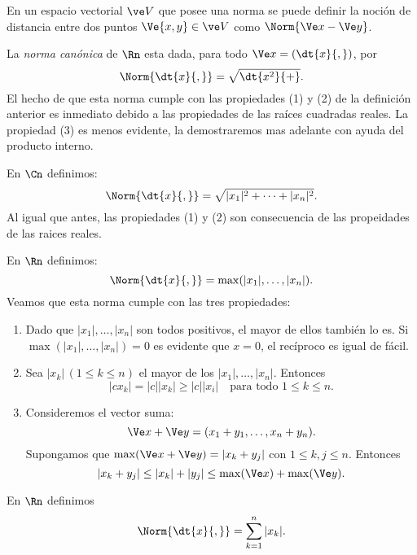 \noindent
En un espacio vectorial $\ve V$ que posee una norma se puede definir la noción de distancia entre dos puntos $\Ve{x,y}\in\ve V$ como $\Norm{\Ve x-\Ve y}$.

\begin{ejem}
	La \emph{norma canónica} de $\Rn$ esta dada, para todo $\Ve x=(\dt{x}{,})$, por
	\[ \Norm{\dt{x}{,}} = \sqrt{\dt{x^2}{+}}. \]
	El hecho de que esta norma cumple con las propiedades (1) y (2) de la definición anterior es inmediato debido a las propiedades de las raíces cuadradas reales. La propiedad (3) es menos evidente, la demostraremos mas adelante con ayuda del producto interno.
\end{ejem}

\begin{ejem}
	En $\Cn$ definimos:
	\[ \Norm{\dt{x}{,}} = \sqrt{|x_1|^2+\dots+|x_n|^2}. \]
	Al igual que antes, las propiedades (1) y (2) son consecuencia de las propeidades de las raices reales.
\end{ejem}

\begin{ejem}
	En $\Rn$ definimos:
	\[ \Norm{\dt{x}{,}} = \max(|x_1|,\dots,|x_n|). \]
	Veamos que esta norma cumple con las tres propiedades:
	\begin{enumerate}
		\item Dado que $|x_1|,\dots,|x_n|$ son todos positivos, el mayor de ellos también lo es. Si $\max(|x_1|,\dots,|x_n|) = 0$ es evidente que $x=0$, el recíproco es igual de fácil.
		\item Sea $|x_k|\,(1\leq k\leq n)$ el mayor de los $|x_1|,\dots,|x_n|$. Entonces
		\[ |cx_k| = |c||x_k| \geq |c||x_i| \quad\text{para todo $1\leq k\leq n$}. \]
		\item Consideremos el vector suma:
		\[ \Ve x+\Ve y = (x_1+y_1,\dots,x_n+y_n). \]
		Supongamos que $\max(\Ve x+\Ve y) = |x_k+y_j|$ con $1\leq k,j\leq n$. Entonces
		\[ |x_k+y_j|\leq|x_k|+|y_j|\leq\max(\Ve x) + \max(\Ve y). \]
	\end{enumerate}
\end{ejem}
\begin{ejem}
	En $\Rn$ definimos
	\[ \Norm{\dt{x}{,}} = \sum_{k=1}^{n} |x_k|. \]
\end{ejem}
